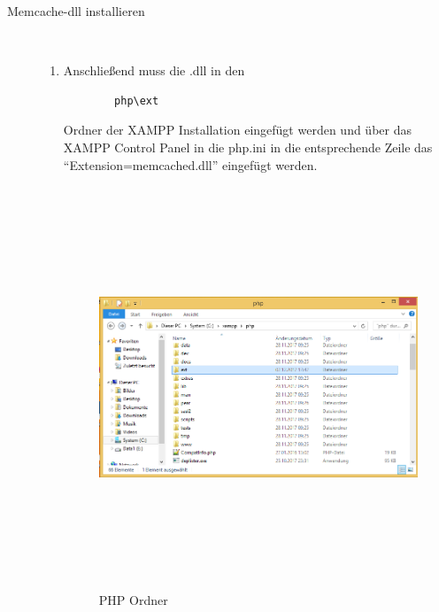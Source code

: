 \documentclass[a4paper, 12pt]{scrartcl}
\begin{document}
\begin{description}
\begin{enumerate}
\begin{verbatim}
      \end{verbatim}    
        	
   \end{enumerate}
   \item[Memcache-dll installieren]~\par
   \begin{enumerate}
   	 \item Anschließend muss die .dll in den 
   	 \begin{verbatim}
   	 	php\ext
   	 \end{verbatim} 
   	 Ordner der XAMPP Installation eingefügt werden und über das XAMPP Control Panel in die php.ini in die entsprechende Zeile das "`Extension=memcached.dll"' eingefügt werden.

\begin{figure}[H]
\centering
\includegraphics[height=12cm, width=15cm, keepaspectratio]{mem3.png}
\caption{PHP Ordner}
\end{figure} 


\end{enumerate}
\end{description}
\end{document}
